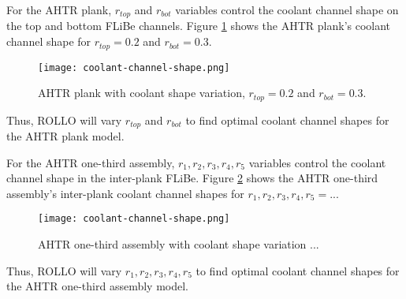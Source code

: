 For the \gls{AHTR} plank, $r_{top}$ and $r_{bot}$ variables control the coolant channel 
shape on the top and bottom \gls{FLiBe} channels. 
Figure \ref{fig:coolant-channel-shape} shows the \gls{AHTR} plank's coolant channel 
shape for $r_{top} = 0.2$ and $r_{bot} = 0.3$.
\begin{figure}[htbp]
    \centering
        \texttt{[image: coolant-channel-shape.png]}
    \raggedright
    \caption{\acrfull{AHTR} plank with coolant shape variation, $r_{top} 
    = 0.2$ and $r_{bot} = 0.3$.}  
    \label{fig:coolant-channel-shape}
\end{figure}
Thus, \gls{ROLLO} will vary $r_{top}$ and $r_{bot}$ to find optimal coolant 
channel shapes for the \gls{AHTR} plank model.

For the \gls{AHTR} one-third assembly, $r_1, r_2, r_3, r_4, r_5$ variables control the
coolant channel shape in the inter-plank \gls{FLiBe}. 
Figure \ref{fig:coolant-channel-shape-assem} shows the \gls{AHTR} one-third assembly's 
inter-plank coolant channel shapes for $r_1, r_2, r_3, r_4, r_5 = ... $
\begin{figure}[htbp]
    \centering
        \texttt{[image: coolant-channel-shape.png]}
    \raggedright
    \caption{\acrfull{AHTR} one-third assembly with coolant shape variation ...}  
    \label{fig:coolant-channel-shape-assem}
\end{figure}
Thus, \gls{ROLLO} will vary $r_1, r_2, r_3, r_4, r_5$ to find optimal coolant 
channel shapes for the \gls{AHTR} one-third assembly model.

